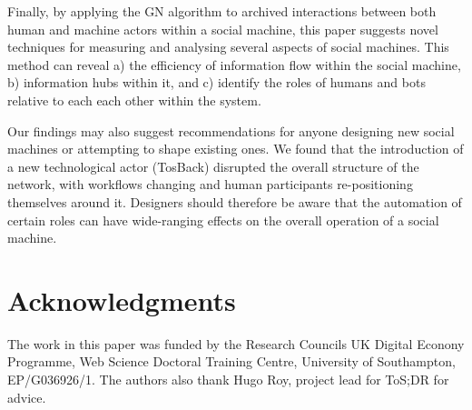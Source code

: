 \documentclass{sig-alternate}
\begin{document}
Finally, by applying the GN algorithm to archived interactions between both human and machine actors within a social machine, this paper suggests novel techniques for measuring and analysing several aspects of social machines. This method can reveal a) the efficiency of information flow within the social machine, b) information hubs within it, and c) identify the roles of humans and bots relative to each each other within the system.

Our findings may also suggest recommendations for anyone designing new social machines or attempting to shape existing ones. We found that the introduction of a new technological actor (TosBack) disrupted the overall structure of the network, with workflows changing and human participants re-positioning themselves around it. Designers should therefore be aware that the automation of certain roles can have wide-ranging effects on the overall operation of a social machine.

\section{Acknowledgments}

The work in this paper was funded by the Research Councils UK Digital Econony Programme, Web Science Doctoral Training Centre, University of Southampton, EP/G036926/1. The authors also thank Hugo Roy, project lead for ToS;DR for advice.

%

%
%
\appendix
\end{document}
